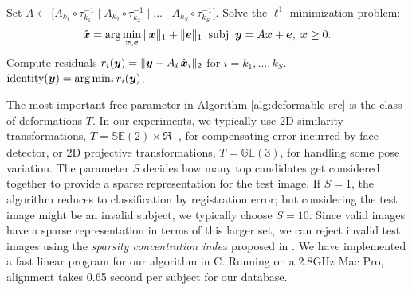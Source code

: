 \begin{algorithm}[thb]
\begin{small}
\begin{algorithmic}[1]
\STATE Set $A \leftarrow \big[ A_{k_1} \circ \tau_{k_1}^{-1} \mid A_{k_2} \circ \tau_{k_2}^{-1} \mid \dots \mid A_{k_S} \circ \tau_{k_S}^{-1} \big]$. 
\STATE Solve the $\ell^1$-minimization problem: \vspace{0mm}
$$\hat{\x} = \arg \min_{\x, \e} \| \x \|_1 + \|\e\|_1 \;\; \text{subj} \;\; \y = A \x + \e, \;\x \ge 0.\vspace{0mm}$$
\STATE Compute residuals $r_i({\boldsymbol{y}}) = \| {{\boldsymbol{y}}} - {A}_i \, \hat{{\boldsymbol{x}}}_i \|_2$ for $i = k_1, \dots, k_S$.
 $\mbox{identity}({\boldsymbol{y}}) = \arg\min_i r_i({\boldsymbol{y}})$.
\end{algorithmic}
\end{small}
\end{algorithm}\vspace{0mm}

The most important free parameter in Algorithm \ref{alg:deformable-src} is the class of deformations $T$. In our experiments, we typically use 2D similarity transformations, $T = \mathbb{SE}(2)\times \Re_+$, for compensating error incurred by face detector, or 2D projective transformations, $T = \mathbb{GL}(3)$, for handling some pose variation. The parameter $S$ decides how many top candidates get considered together to provide a sparse representation for the test image. If $S = 1$, the algorithm reduces to classification by registration error; but considering the test image might be an invalid subject, we typically choose $S = 10$. Since valid images have a sparse representation in terms of this larger set, we can reject invalid test images using the {\em sparsity concentration index} proposed in \cite{Wright2009-PAMI}. We have implemented a fast linear program for our algorithm in C. Running on a 2.8GHz Mac Pro, alignment takes 0.65 second per subject for our database. \vspace{0mm}



